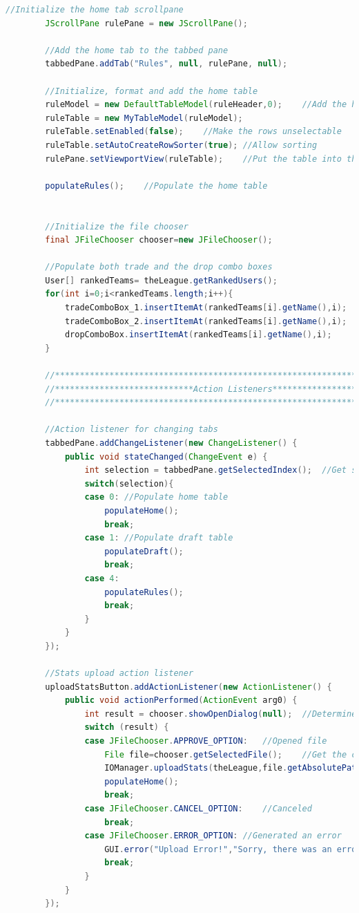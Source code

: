 \documentclass[12pt]{report}
\begin{document}
\begin{singlespace}
\begin{lstlisting}[language=Java,label=some-code,caption={GUI.java}]
		//Initialize the home tab scrollpane
		JScrollPane rulePane = new JScrollPane();
		
		//Add the home tab to the tabbed pane
		tabbedPane.addTab("Rules", null, rulePane, null);
		
		//Initialize, format and add the home table
		ruleModel = new DefaultTableModel(ruleHeader,0);	//Add the header but no rows
		ruleTable = new MyTableModel(ruleModel);
		ruleTable.setEnabled(false);	//Make the rows unselectable
		ruleTable.setAutoCreateRowSorter(true);	//Allow sorting
		rulePane.setViewportView(ruleTable);	//Put the table into the scroll pane
		
		populateRules();	//Populate the home table
		
		
		//Initialize the file chooser
		final JFileChooser chooser=new JFileChooser();
		
		//Populate both trade and the drop combo boxes
		User[] rankedTeams= theLeague.getRankedUsers();
		for(int i=0;i<rankedTeams.length;i++){
			tradeComboBox_1.insertItemAt(rankedTeams[i].getName(),i);
			tradeComboBox_2.insertItemAt(rankedTeams[i].getName(),i);
			dropComboBox.insertItemAt(rankedTeams[i].getName(),i);
		}
		
		//************************************************************************
		//****************************Action Listeners****************************
		//************************************************************************
		
		//Action listener for changing tabs
		tabbedPane.addChangeListener(new ChangeListener() {
			public void stateChanged(ChangeEvent e) {
				int selection = tabbedPane.getSelectedIndex();	//Get selected tab
				switch(selection){
				case 0:	//Populate home table
					populateHome();
					break;
				case 1:	//Populate draft table
					populateDraft();
					break;
				case 4:
					populateRules();
					break;
				}
			}
		});
		
		//Stats upload action listener
		uploadStatsButton.addActionListener(new ActionListener() {
			public void actionPerformed(ActionEvent arg0) {
				int result = chooser.showOpenDialog(null);	//Determine what the user pressed
				switch (result) {
				case JFileChooser.APPROVE_OPTION:	//Opened file
					File file=chooser.getSelectedFile();	//Get the chosen file
					IOManager.uploadStats(theLeague,file.getAbsolutePath());	//Pass the file path to the parser method
					populateHome();
					break;
				case JFileChooser.CANCEL_OPTION:	//Canceled
					break;
				case JFileChooser.ERROR_OPTION:	//Generated an error
					GUI.error("Upload Error!","Sorry, there was an error opening the stat file.");
					break;
				}
			}
		});
		

\end{lstlisting}
\end{singlespace}
\end{document}
